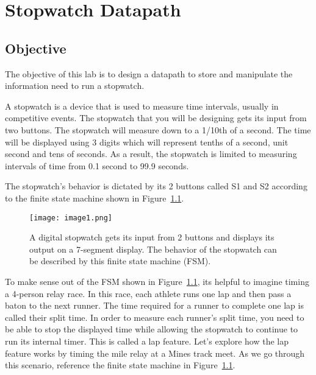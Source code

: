 \chapter{Stopwatch Datapath}
\label{chapter:stopDatapath}
\graphicspath{ {./Lab09Datapath/Fig} }



\hypertarget{objective}{%
\section{Objective}\label{setion:swObjective}}

The objective of this lab is to design a datapath to store and
manipulate the information need to run a stopwatch.


A stopwatch is a device that is used to measure time intervals, usually
in competitive events. The stopwatch that you will be designing gets its
input from two buttons. The stopwatch will measure down to a 1/10th of a
second. The time will be displayed using 3 digits which will represent
tenths of a second, unit second and tens of seconds. As a result, the
stopwatch is limited to measuring intervals of time from 0.1 second to
99.9 seconds.

The stopwatch's behavior is dictated by its 2 buttons called S1 and S2
according to the finite state machine shown in Figure~\ref{fig:swDPbehavior}.

\begin{figure}
\texttt{[image: image1.png]}
\caption{A digital stopwatch gets its input from 2 buttons and displays
its output on a 7-segment display. The behavior of the stopwatch can be
described by this finite state machine (FSM).}
\label{fig:swDPbehavior}
\end{figure}

To make sense out of the FSM shown in Figure~\ref{fig:swDPbehavior}, its helpful to imagine
timing a 4-person relay race. In this race, each athlete runs one lap
and then pass a baton to the next runner. The time required for a runner
to complete one lap is called their split time. In order to measure each
runner's split time, you need to be able to stop the displayed time
while allowing the stopwatch to continue to run its internal timer. This
is called a lap feature. Let's explore how the lap feature works by
timing the mile relay at a Mines track meet. As we go through this
scenario, reference the finite state machine in Figure~\ref{fig:swDPbehavior}.

